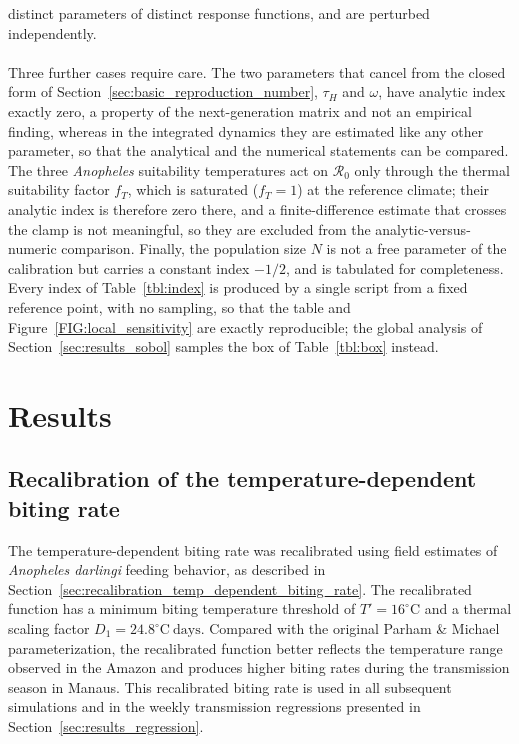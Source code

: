 \documentclass[a4paper,fleqn]{cas-dc}
\begin{document}
distinct parameters of distinct response functions, and are perturbed
independently.
\\\\
Three further cases require care. The two parameters that
cancel from the closed form of Section~\ref{sec:basic_reproduction_number},
$\tau_H$ and $\omega$, have analytic index exactly zero, a property of the
next-generation matrix and not an empirical finding, whereas in the
integrated dynamics they are estimated like any other parameter, so that the
analytical and the numerical statements can be compared. The three
\textit{Anopheles} suitability temperatures act on $\mathcal{R}_0$ only
through the thermal suitability factor $f_T$, which is saturated
($f_T = 1$) at the reference climate; their analytic index is therefore zero
there, and a finite-difference estimate that crosses the clamp is not
meaningful, so they are excluded from the analytic-versus-numeric
comparison. Finally, the population size $N$ is not a free parameter of the
calibration but carries a constant index $-1/2$, and is tabulated for
completeness. Every index of Table~\ref{tbl:index} is produced by a single
script from a fixed reference point, with no sampling, so that the table and
Figure~\ref{FIG:local_sensitivity} are exactly reproducible; the global
analysis of Section~\ref{sec:results_sobol} samples the box of
Table~\ref{tbl:box} instead.

\section{Results}
\label{sec:results}

\subsection{Recalibration of the temperature-dependent biting rate}
\label{sec:results_biting_rate}
The temperature-dependent biting rate was recalibrated using field estimates of \textit{Anopheles darlingi} feeding behavior, as described in Section~\ref{sec:recalibration_temp_dependent_biting_rate}. The recalibrated function has a minimum biting temperature threshold of $T' = 16^{\circ}\mathrm{C}$ and a thermal scaling factor $D_1 = 24.8^{\circ}\mathrm{C}\ \mathrm{days}$. Compared with the original Parham \& Michael parameterization, the recalibrated function better reflects the temperature range observed in the Amazon and produces higher biting rates during the transmission season in Manaus. %
This recalibrated biting rate is used in all subsequent simulations and in the weekly transmission regressions presented in Section~\ref{sec:results_regression}.
\end{document}
